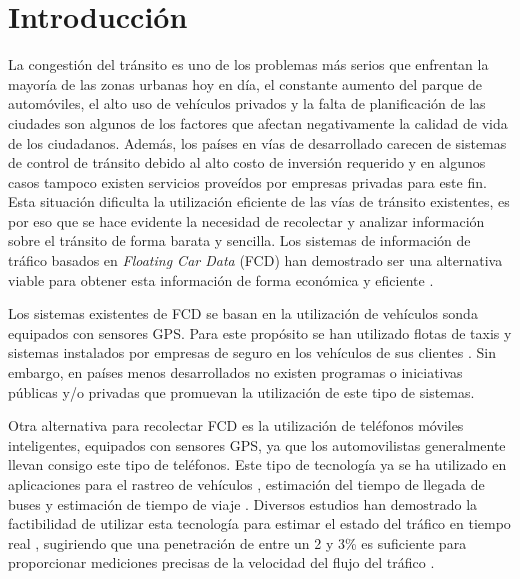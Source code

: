\section{Introducción}

La congestión del tránsito es uno de los problemas más serios que enfrentan la mayoría de las zonas urbanas hoy en día, el constante aumento del parque de automóviles, el alto uso de vehículos privados y la falta de planificación de las ciudades son algunos de los factores que afectan negativamente la calidad de vida de los ciudadanos. Además, los países en vías de desarrollado carecen de sistemas de control de tránsito debido al alto costo de inversión requerido y en algunos casos tampoco existen servicios proveídos por empresas privadas para este fin. Esta situación dificulta la utilización eficiente de las vías de tránsito existentes, es por eso que se hace evidente la necesidad de recolectar y analizar información sobre el tránsito de forma barata y sencilla. Los sistemas de información de tráfico basados en \emph{Floating Car Data} (FCD) han demostrado ser una alternativa viable para obtener esta información de forma económica y eficiente \cite{schafer2002traffic,reinthaler2007evaluation}.

Los sistemas existentes de FCD se basan en la utilización de vehículos sonda equipados con sensores GPS. Para este propósito se han utilizado flotas de taxis \cite{schafer2002traffic,reinthaler2007evaluation} y sistemas instalados por empresas de seguro en los vehículos de sus clientes \cite{giovannini2011novel}. Sin embargo, en países menos desarrollados no existen programas o iniciativas públicas y/o privadas que promuevan la utilización de este tipo de sistemas.

Otra alternativa para recolectar FCD es la utilización de teléfonos móviles inteligentes, equipados con sensores GPS, ya que los automovilistas generalmente llevan consigo este tipo de teléfonos. Este tipo de tecnología ya se ha utilizado en aplicaciones para el rastreo de vehículos \cite{thiagarajan2010cooperative}, estimación del tiempo de llegada de buses \cite{zhou2012long} y estimación de tiempo de viaje \cite{thiagarajan2009vtrack}. Diversos estudios han demostrado la factibilidad de utilizar esta tecnología para estimar el estado del tráfico en tiempo real \cite{tao2012real,herrera2010evaluation}, sugiriendo que una penetración de entre un 2 y 3\% es suficiente para proporcionar mediciones precisas de la velocidad del flujo del tráfico \cite{herrera2010evaluation}.

